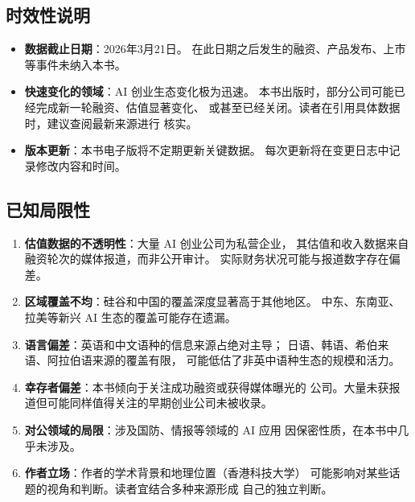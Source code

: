 \subsection{时效性说明}

\begin{itemize}
  \item \textbf{数据截止日期}：2026年3月21日。
    在此日期之后发生的融资、产品发布、上市等事件未纳入本书。

  \item \textbf{快速变化的领域}：AI 创业生态变化极为迅速。
    本书出版时，部分公司可能已经完成新一轮融资、估值显著变化、
    或甚至已经关闭。读者在引用具体数据时，建议查阅最新来源进行
    核实。

  \item \textbf{版本更新}：本书电子版将不定期更新关键数据。
    每次更新将在变更日志中记录修改内容和时间。
\end{itemize}

\subsection{已知局限性}

\begin{enumerate}
  \item \textbf{估值数据的不透明性}：大量 AI 创业公司为私营企业，
    其估值和收入数据来自融资轮次的媒体报道，而非公开审计。
    实际财务状况可能与报道数字存在偏差。

  \item \textbf{区域覆盖不均}：硅谷和中国的覆盖深度显著高于其他地区。
    中东、东南亚、拉美等新兴 AI 生态的覆盖可能存在遗漏。

  \item \textbf{语言偏差}：英语和中文语种的信息来源占绝对主导；
    日语、韩语、希伯来语、阿拉伯语来源的覆盖有限，
    可能低估了非英中语种生态的规模和活力。

  \item \textbf{幸存者偏差}：本书倾向于关注成功融资或获得媒体曝光的
    公司。大量未获报道但可能同样值得关注的早期创业公司未被收录。

  \item \textbf{对公领域的局限}：涉及国防、情报等领域的 AI 应用
    因保密性质，在本书中几乎未涉及。

  \item \textbf{作者立场}：作者的学术背景和地理位置（香港科技大学）
    可能影响对某些话题的视角和判断。读者宜结合多种来源形成
    自己的独立判断。
\end{enumerate}



